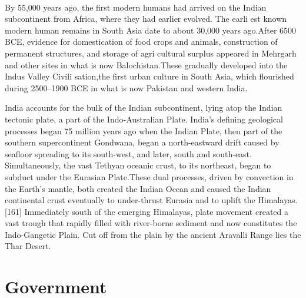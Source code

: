 \documentclass[12pt,a4paper]{article}
\begin{document}
\paragraph{}
By 55,000 years ago, the first modern humans had arrived on the Indian
subcontinent from Africa, where they had earlier evolved. The earli
est known modern human remains in South Asia date to about 30,000
years ago.After 6500 BCE, evidence for domestication of food crops
and animals, construction of permanent structures, and storage of agri
cultural surplus appeared in Mehrgarh and other sites in what is now
Balochistan.These gradually developed into the Indus Valley Civili
sation,the first urban culture in South Asia, which flourished during
2500–1900 BCE in what is now Pakistan and western India.
\begin{flushright}
	India accounts for the bulk of the Indian subcontinent, lying atop the Indian tectonic plate, a part of the Indo-Australian Plate. India's defining geological processes began 75 million years ago when the Indian Plate, then part of the southern supercontinent Gondwana, began a north-eastward drift caused by seafloor spreading to its south-west, and later, south and south-east. Simultaneously, the vast Tethyan oceanic crust, to its northeast, began to subduct under the Eurasian Plate.These dual processes, driven by convection in the Earth's mantle, both created the Indian Ocean and caused the Indian continental crust eventually to under-thrust Eurasia and to uplift the Himalayas.[161] Immediately south of the emerging Himalayas, plate movement created a vast trough that rapidly filled with river-borne sediment and now constitutes the Indo-Gangetic Plain. Cut off from the plain by the ancient Aravalli Range lies the Thar Desert.
\end{flushright}

\section{Government}
\end{document}

